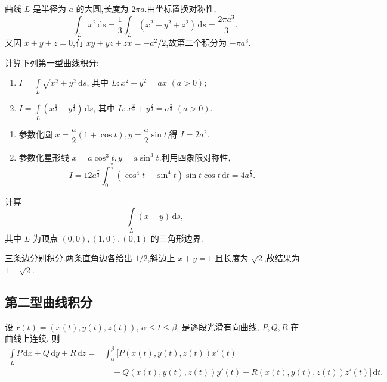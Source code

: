 \begin{solution}
    曲线 $L$ 是半径为 $a$ 的大圆,长度为 $2\pi a$.由坐标置换对称性,
    \[
        \int_Lx^2\,\mathrm{d}s=\dfrac{1}{3}\int_L(x^2+y^2+z^2)\,\mathrm{d}s=\dfrac{2\pi a^3}{3}.
    \]
    又因 $x+y+z=0$,有 $xy+yz+zx=-a^2/2$,故第二个积分为 $-\pi a^3$.
\end{solution}

\begin{example}
    计算下列第一型曲线积分:
    \begin{enumerate}
        \item $\displaystyle I=\int\limits_L\sqrt{x^2+y^2}\,\mathrm{d}s$, 其中 $L:x^2+y^2=ax$ $(a>0)$;
        \item $\displaystyle I=\int\limits_L\left(x^{\frac{4}{3}}+y^{\frac{4}{3}}\right)\,\mathrm{d}s$, 其中 $L:x^{\frac{2}{3}}+y^{\frac{2}{3}}=a^{\frac{2}{3}}$ $(a>0)$.
    \end{enumerate}
\end{example}
\exampleblank

\begin{solution}
    \begin{enumerate}
        \item 参数化圆 $x=\dfrac{a}{2}(1+\cos t),y=\dfrac{a}{2}\sin t$,得 $I=2a^2$.
        \item 参数化星形线 $x=a\cos^3t,y=a\sin^3t$.利用四象限对称性,
              \[
                  I=12a^{\frac{7}{3}}\int_0^{\frac{\pi}{2}}(\cos^4t+\sin^4t)\sin t\cos t\,\mathrm{d}t=4a^{\frac{7}{3}}.
              \]
    \end{enumerate}
\end{solution}

\begin{example}
    计算
    \[
        \int\limits_L(x+y)\,\mathrm{d}s,
    \]
    其中 $L$ 为顶点 $(0,0),(1,0),(0,1)$ 的三角形边界.
\end{example}
\exampleblank

\begin{solution}
    三条边分别积分.两条直角边各给出 $1/2$,斜边上 $x+y=1$ 且长度为 $\sqrt{2}$,故结果为 $1+\sqrt{2}$.
\end{solution}



\subsection{第二型曲线积分}

\begin{theorem}[\markstar]
    设 $\bm r(t)=(x(t),y(t),z(t))$, $\alpha\leq t\leq\beta$, 是逐段光滑有向曲线, $P,Q,R$ 在曲线上连续, 则
    \[
        \begin{aligned}
            \int\limits_L P\,\mathrm{d}x+Q\,\mathrm{d}y+R\,\mathrm{d}z
            ={} & \int_\alpha^\beta\bigl\lbrack P(x(t),y(t),z(t))x'(t)                          \\
                & \quad+Q(x(t),y(t),z(t))y'(t)+R(x(t),y(t),z(t))z'(t)\bigr\rbrack\,\mathrm{d}t.
        \end{aligned}
    \]
\end{theorem}

